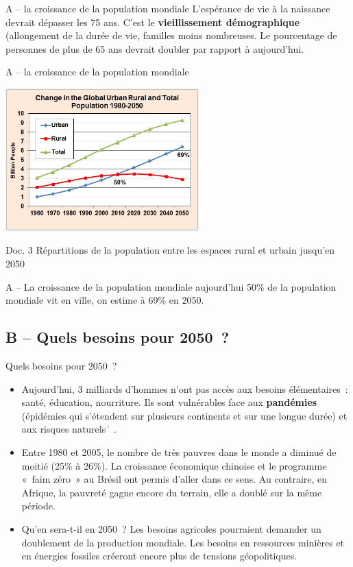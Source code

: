 \documentclass[C]{beamer}
\begin{document}
	\begin{frame}{A -- la croissance de la population mondiale}
	L'espérance de vie à la naissance devrait dépasser les 75 ans. C'est le \textbf{vieillissement démographique} (allongement de la durée de vie, familles moins nombreuses. Le pourcentage de personnes de plus de 65 ans devrait doubler par rapport à aujourd'hui.
	\end{frame}
		
	\begin{frame}{A -- la croissance de la population mondiale}
	\begin{center}
	\includegraphics[height=5.5cm]{images/carte_1_13.jpg}
	\end{center}
	Doc. 3 Répartitions de la population entre les espaces rural et urbain jusqu'en 2050
	\end{frame}
	
	\begin{frame}{A -- La croissance de la population mondiale}
	aujourd'hui 50\% de la population mondiale vit en ville, on estime à 69\% en 2050.
	\end{frame}
	
	\subsection*{B -- Quels besoins pour 2050~?}
	\begin{frame}{Quels besoins pour 2050~?}
	\begin{itemize}
	\item Aujourd'hui, 3 milliards d'hommes n'ont pas accès aux besoins élémentaires~: santé, éducation, nourriture. Ils sont vulnérables face aux \textbf{pandémies} (épidémies qui s'étendent sur plusieurs continents et sur une longue durée) et aux risques naturels\.\
\pause
	.\item Entre 1980 et 2005, le nombre de très pauvres dans le monde a diminué de moitié (25\% à 26\%). La croissance économique chinoise et le programme «~faim zéro~» au Brésil ont permis d'aller dans ce sens. Au contraire, en Afrique, la pauvreté gagne encore du terrain, elle a doublé sur la m\^eme période.\\
\pause
	\item Qu'en sera-t-il en 2050~? Les besoins agricoles pourraient demander un doublement de la production mondiale. Les besoins en ressources minières et en énergies fossiles créeront encore plus de tensions géopolitiques.
	\end{itemize}
	\end{frame}
	
\end{document}
